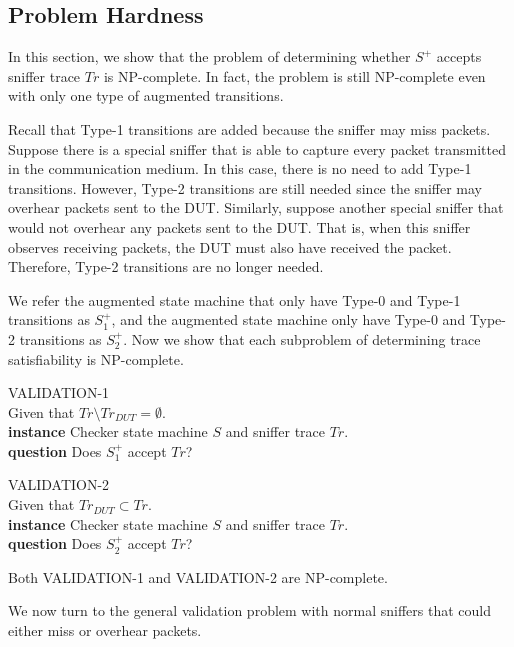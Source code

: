 \subsection{Problem Hardness}
\label{subsec:hard}

In this section, we show that the problem of determining whether $S^+$ accepts
sniffer trace $Tr$ is NP-complete.
%
In fact, the problem is still NP-complete
even with only one type of augmented transitions.

Recall that Type-1 transitions are added because the sniffer may miss packets.
%
Suppose there is a special sniffer that is able to capture every packet
transmitted in the communication medium.
%
In this case, there is no need to add Type-1 transitions.
%
However, Type-2 transitions are still needed since the sniffer may overhear
packets sent to the DUT.
%
Similarly, suppose another special sniffer that would not overhear any packets
sent to the DUT. That is, when this sniffer observes receiving packets, the DUT
must also have received the packet.
%
Therefore, Type-2 transitions are no longer
needed.


We refer the augmented state machine that only have Type-0 and Type-1
transitions as $S^+_1$, and the augmented state machine only have Type-0 and
Type-2 transitions as $S^+_2$.
%
Now we show that each subproblem of determining trace satisfiability is
NP-complete.

\begin{problem}
  VALIDATION-1\\
  Given that $Tr\setminus Tr_{DUT}=\emptyset$.\\
  \textbf{instance} Checker state machine $S$ and sniffer trace $Tr$.\\
  \textbf{question} Does $S^+_1$ accept $Tr$?
\end{problem}

\begin{problem}
  VALIDATION-2\\
  Given that $Tr_{DUT} \subset Tr$.\\
  \textbf{instance} Checker state machine $S$ and sniffer trace $Tr$.\\
  \textbf{question} Does $S^+_2$ accept $Tr$?
\end{problem}


\begin{lemma}
  Both VALIDATION-1 and VALIDATION-2 are NP-complete.
\end{lemma}

We now turn to the general validation problem with normal sniffers that could
either miss or overhear packets.

